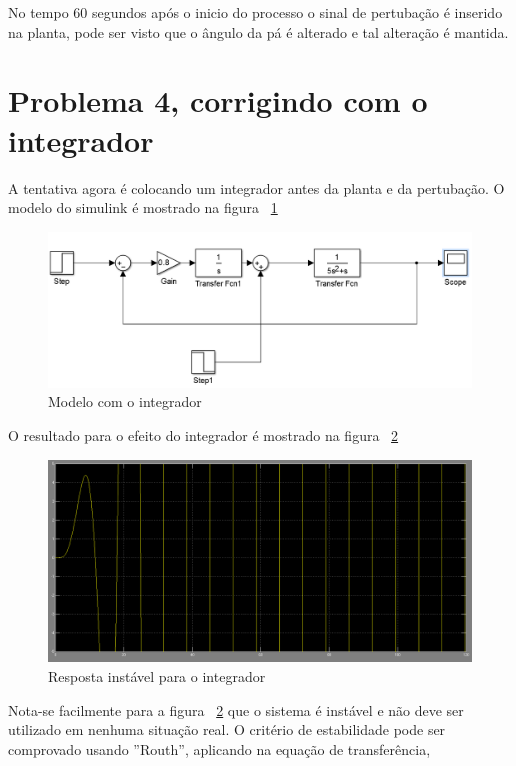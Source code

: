 \documentclass[a4paper, 10pt]{article}
\begin{document}
No tempo 60 segundos após o inicio do processo o sinal de pertubação é inserido 
na planta, pode ser visto que o ângulo da pá é alterado e tal alteração é mantida.

\section{Problema 4, corrigindo com o integrador}

A tentativa agora é colocando um integrador antes da planta e da pertubação. O modelo do simulink é mostrado na figura ~\ref{fig:modeloIntregrador}

\begin{figure}[!ht]
	\centering
	\includegraphics[scale=.3]{fq4.png}
    \caption{Modelo com o integrador}
    \label{fig:modeloIntregrador}
\end{figure}

O resultado para o efeito do integrador é mostrado na figura ~\ref{fig:respInstavelIntegrador}

\begin{figure}[!ht]
	\centering
	\includegraphics[scale=.3]{rq4.png}
    \caption{Resposta instável para o integrador}
    \label{fig:respInstavelIntegrador}
\end{figure}

Nota-se facilmente para a figura ~\ref{fig:respInstavelIntegrador} que o sistema é instável e não deve ser utilizado em nenhuma situação real.
O critério de estabilidade pode ser comprovado usando ''Routh'', aplicando
na equação de transferência,
\end{document}
